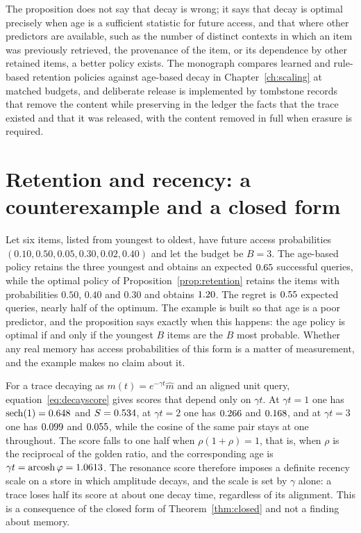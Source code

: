 The proposition does not say that decay is wrong; it says that decay is optimal precisely when age is a sufficient statistic for future access, and that where other predictors are available, such as the number of distinct contexts in which an item was previously retrieved, the provenance of the item, or its dependence by other retained items, a better policy exists. The monograph compares learned and rule-based retention policies against age-based decay in Chapter~\ref{ch:scaling} at matched budgets, and deliberate release is implemented by tombstone records that remove the content while preserving in the ledger the facts that the trace existed and that it was released, with the content removed in full when erasure is required.

\section*{Retention and recency: a counterexample and a closed form}\label{sec:retain29}

\begin{counterex}\label{cex:retain29}
Let six items, listed from youngest to oldest, have future access probabilities $(0.10,0.50,0.05,0.30,0.02,0.40)$ and let the budget be $B=3$. The age-based policy retains the three youngest and obtains an expected $0.65$ successful queries, while the optimal policy of Proposition~\ref{prop:retention} retains the items with probabilities $0.50$, $0.40$ and $0.30$ and obtains $1.20$. The regret is $0.55$ expected queries, nearly half of the optimum. The example is built so that age is a poor predictor, and the proposition says exactly when this happens: the age policy is optimal if and only if the youngest $B$ items are the $B$ most probable. Whether any real memory has access probabilities of this form is a matter of measurement, and the example makes no claim about it.
\end{counterex}

\begin{workedex}\label{ex:recency29}
For a trace decaying as $m(t)=e^{-\gamma t}\hat m$ and an aligned unit query, equation~\eqref{eq:decayscore} gives scores that depend only on $\gamma t$. At $\gamma t=1$ one has $\operatorname{sech}(1)=0.648$ and $S=0.534$, at $\gamma t=2$ one has $0.266$ and $0.168$, and at $\gamma t=3$ one has $0.099$ and $0.055$, while the cosine of the same pair stays at one throughout. The score falls to one half when $\rho(1+\rho)=1$, that is, when $\rho$ is the reciprocal of the golden ratio, and the corresponding age is $\gamma t=\operatorname{arcosh}\varphi=1.0613$. The resonance score therefore imposes a definite recency scale on a store in which amplitude decays, and the scale is set by $\gamma$ alone: a trace loses half its score at about one decay time, regardless of its alignment. This is a consequence of the closed form of Theorem~\ref{thm:closed} and not a finding about memory.
\end{workedex}


